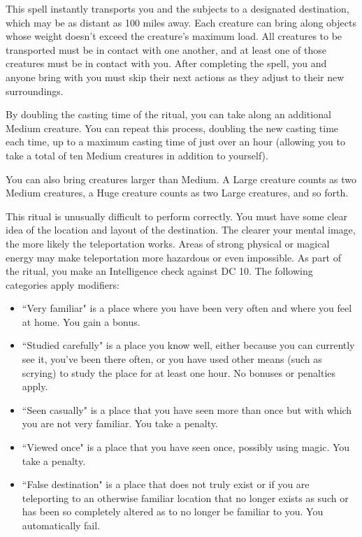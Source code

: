 \spelleffect This spell instantly transports you and the subjects to a designated destination, which may be as distant as 100 miles away. Each creature can bring along objects whose weight doesn't exceed the creature's maximum load. All creatures to be transported must be in contact with one another, and at least one of those creatures must be in contact with you. After completing the spell, you and anyone bring with you must skip their next actions as they adjust to their new surroundings.
\par By doubling the casting time of the ritual, you can take along an additional Medium creature. You can repeat this process, doubling the new casting time each time, up to a maximum casting time of just over an hour (allowing you to take a total of ten Medium creatures in addition to yourself).
\par You can also bring creatures larger than Medium. A Large creature counts as two Medium creatures, a Huge creature counts as two Large creatures, and so forth.
\par This ritual is unusually difficult to perform correctly. You must have some clear idea of the location and layout of the destination. The clearer your mental image, the more likely the teleportation works. Areas of strong physical or magical energy may make teleportation more hazardous or even impossible. As part of the ritual, you make an Intelligence check against DC 10. The following categories apply modifiers:
\begin{itemize}
    \item ``Very familiar" is a place where you have been very often and where you feel at home. You gain a  bonus.
    \item ``Studied carefully" is a place you know well, either because you can currently see it, you've been there often, or you have used other means (such as scrying) to study the place for at least one hour. No bonuses or penalties apply.
    \item ``Seen casually" is a place that you have seen more than once but with which you are not very familiar. You take a  penalty.
    \item ``Viewed once" is a place that you have seen once, possibly using magic. You take a  penalty.
    \item ``False destination" is a place that does not truly exist or if you are teleporting to an otherwise familiar location that no longer exists as such or has been so completely altered as to no longer be familiar to you. You automatically fail.
\end{itemize}

